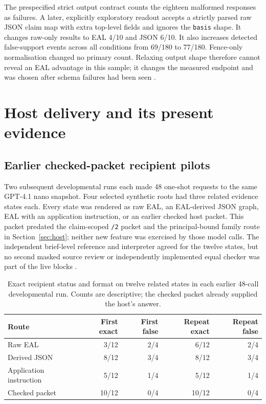 \documentclass[preprint,12pt]{elsarticle}
\begin{document}
The prespecified strict output contract counts the eighteen malformed responses as failures. A later, explicitly exploratory readout accepts a strictly parsed raw JSON claim map with extra top-level fields and ignores the \texttt{basis} shape. It changes raw-only results to EAL 4/10 and JSON 6/10. It also increases detected false-support events across all conditions from 69/180 to 77/180. Fence-only normalisation changed no primary count. Relaxing output shape therefore cannot reveal an EAL advantage in this sample; it changes the measured endpoint and was chosen after schema failures had been seen \citep{earlNotation}.

\section{Host delivery and its present evidence}\label{sec:delivery}
\subsection{Earlier checked-packet recipient pilots}
Two subsequent developmental runs each made 48 one-shot requests to the same GPT-4.1 nano snapshot. Four selected synthetic roots had three related evidence states each. Every state was rendered as raw EAL, an EAL-derived JSON graph, EAL with an application instruction, or an earlier checked host packet. This packet predated the claim-scoped \texttt{/2} packet and the principal-bound family route in Section~\ref{sec:host}; neither new feature was exercised by those model calls. The independent brief-level reference and interpreter agreed for the twelve states, but no second masked source review or independently implemented equal checker was part of the live blocks \citep{earlArtifactPilot,earlArtifactReplication}.

\begin{table}[!htbp]
\centering
\small
\caption{Exact recipient status and format on twelve related states in each earlier 48-call developmental run. Counts are descriptive; the checked packet already supplied the host's answer.}
\label{tab:artifact-pilots}
\setlength{\tabcolsep}{4pt}
\begin{tabular}{@{}lrrrr@{}}
\toprule
Route & First exact & First false & Repeat exact & Repeat false\\
\midrule
Raw EAL & 3/12 & 2/4 & 6/12 & 2/4\\
Derived JSON & 8/12 & 3/4 & 8/12 & 3/4\\
Application instruction & 5/12 & 1/4 & 5/12 & 1/4\\
Checked packet & 10/12 & 0/4 & 10/12 & 0/4\\
\bottomrule
\end{tabular}
\end{table}
\end{document}
